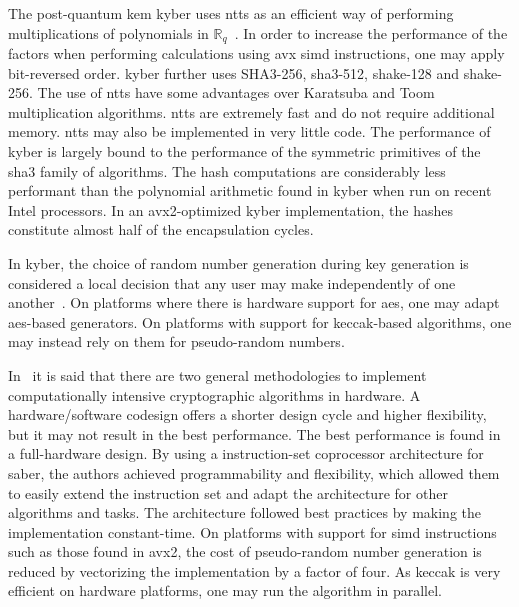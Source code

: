 The \gls{post-quantum} \gls{kem} \gls{kyber} uses \glspl{ntt} as an efficient way of performing multiplications of polynomials in $\mathbb{R}_q$~\cite{kyber2021}. In order to increase the performance of the factors when performing calculations using \gls{avx} \gls{simd} instructions, one may apply bit-reversed order. \gls{kyber} further uses SHA3-256, \gls{sha3}-512, \gls{shake}-128 and \gls{shake}-256. The use of \glspl{ntt} have some advantages over Karatsuba and Toom multiplication algorithms. \glspl{ntt} are extremely fast and do not require additional memory. \glspl{ntt} may also be implemented in very little code. The performance of \gls{kyber} is largely bound to the performance of the symmetric primitives of the \gls{sha3} family of algorithms. The hash computations are considerably less performant than the polynomial arithmetic found in \gls{kyber} when run on recent Intel processors. In an \gls{avx2}-optimized \gls{kyber} implementation, the hashes constitute almost half of the encapsulation cycles.

In \gls{kyber}, the choice of random number generation during key generation is considered a local decision that any user may make independently of one another~\cite{kyber2021}. On platforms where there is hardware support for \gls{aes}, one may adapt \gls{aes}-based generators. On platforms with support for \gls{keccak}-based algorithms, one may instead rely on them for pseudo-random numbers.


In~\cite{roy2020} it is said that there are two general methodologies to implement computationally intensive cryptographic algorithms in hardware. A hardware/software codesign offers a shorter design cycle and higher flexibility, but it may not result in the best performance. The best performance is found in a full-hardware design. By using a instruction-set coprocessor architecture for \gls{saber}, the authors achieved programmability and flexibility, which allowed them to easily extend the instruction set and adapt the architecture for other algorithms and tasks. The architecture followed best practices by making the implementation constant-time. On platforms with support for \gls{simd} instructions such as those found in \gls{avx2}, the cost of pseudo-random number generation is reduced by vectorizing the implementation by a factor of four. As \gls{keccak} is very efficient on hardware platforms, one may run the algorithm in parallel.